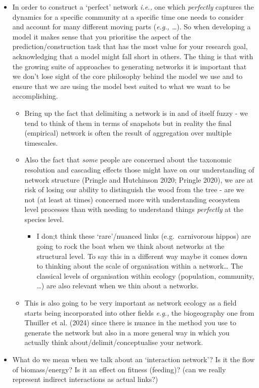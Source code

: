 \documentclass[
  letterpaper,
  DIV=11,
  numbers=noendperiod]{scrartcl}
\providecommand{\tightlist}{%
  \setlength{\itemsep}{0pt}\setlength{\parskip}{0pt}}\usepackage{longtable,booktabs,array}
\begin{document}
\begin{itemize}
\item
  In order to construct a `perfect' network \emph{i.e.,} one which
  \emph{perfectly} captures the dynamics for a specific community at a
  specific time one needs to consider and account for many different
  moving parts (\emph{e.g., \ldots{}}). So when developing a model it
  makes sense that you prioritise the aspect of the
  prediction/construction task that has the most value for your research
  goal, acknowledging that a model might fall short in others. The thing
  is that with the growing suite of approaches to generating networks it
  is important that we don't lose sight of the core philosophy behind
  the model we use and to ensure that we are using the model best suited
  to what we want to be accomplishing.

  \begin{itemize}
  \tightlist
  \item
    Bring up the fact that delimiting a network is in and of itself
    fuzzy - we tend to think of them in terms of snapshots but in
    reality the final (empirical) network is often the result of
    aggregation over multiple timescales.
  \item
    Also the fact that \emph{some} people are concerned about the
    taxonomic resolution and cascading effects those might have on our
    understanding of network structure (Pringle and Hutchinson 2020;
    Pringle 2020), we are at risk of losing our ability to distinguish
    the wood from the tree - are we not (at least at times) concerned
    more with understanding ecosystem level processes than with needing
    to understand things \emph{perfectly} at the species level.

    \begin{itemize}
    \tightlist
    \item
      I don;t think these `rare'/nuanced links (e.g.~carnivorous hippos)
      are going to rock the boat when we think about networks at the
      structural level. To say this in a different way maybe it comes
      down to thinking about the scale of organisation within a
      network\ldots{} The classical levels of organisation within
      ecology (population, community, \ldots) are also relevant when we
      thin about a networks.
    \end{itemize}
  \item
    This is also going to be very important as network ecology as a
    field starts being incorporated into other fields \emph{e.g.,} the
    biogeography one from Thuiller et al. (2024) since there is nuance
    in the method you use to generate the network but also in a more
    general way in which you actually think about/delimit/conceptualise
    your network.
  \end{itemize}
\item
  What do we mean when we talk about an `interaction network'? Is it the
  flow of biomass/energy? Is it an effect on fitness (feeding)? (can we
  really represent indirect interactions as actual links?)


\end{itemize}
\end{document}
